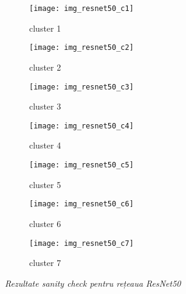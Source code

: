 \begin{figure}[!h]
  \centering
  \begin{subfigure}[t]{0.45\textwidth}
    \caption{cluster 1}
    \texttt{[image: img\_resnet50\_c1]}
  \end{subfigure}
  \hfill
  \begin{subfigure}[t]{0.45\textwidth}
    \caption{cluster 2}
    \texttt{[image: img\_resnet50\_c2]}
  \end{subfigure}
   \hfill
  \begin{subfigure}[t]{0.45\textwidth}
    \caption{cluster 3}
    \texttt{[image: img\_resnet50\_c3]}
  \end{subfigure}
  \hfill
  \begin{subfigure}[t]{0.45\textwidth}
    \caption{cluster 4}
    \texttt{[image: img\_resnet50\_c4]}
  \end{subfigure}
  \hfill
  \begin{subfigure}[t]{0.45\textwidth}
    \caption{cluster 5}
    \texttt{[image: img\_resnet50\_c5]}
  \end{subfigure}
  \hfill
  \begin{subfigure}[t]{0.45\textwidth}
    \caption{cluster 6}
    \texttt{[image: img\_resnet50\_c6]}
  \end{subfigure}
    \hfill
  \begin{subfigure}[t]{0.45\textwidth}
    \caption{cluster 7}
    \texttt{[image: img\_resnet50\_c7]}
  \end{subfigure}
  \caption[Rezultate sanity check pentru rețeaua ResNet50]{\textit{Rezultate sanity check pentru rețeaua ResNet50}}
\end{figure}

